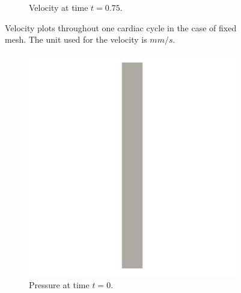 \documentclass[a4paper,11pt,oneside]{book}
\begin{document}
\begin{figure}[h!]
\begin{subfigure}[b]{0.5\linewidth}
        \centering
    \caption{Velocity at time $t = 0.75$.} 
    \label{fig1:d} 
  \end{subfigure} 
  \centering
  \caption{Velocity plots throughout one cardiac cycle in the case of fixed mesh. The unit used for the velocity is $mm/s$.}
  \label{fig1} 
\end{figure}

\newpage

\begin{figure}[h!] 
  \begin{subfigure}[b]{0.5\linewidth}
    \centering
    \includegraphics[width=1.2\linewidth]{images/pressure_fixed_0.png} 
        \centering
    \caption{Pressure at time $t = 0$.} 
    \label{fig4:a} 
    \vspace{4ex}
  \end{subfigure}%
  \begin{subfigure}[b]{0.5\linewidth}
    \centering

\end{subfigure}
\end{figure}
\end{document}
